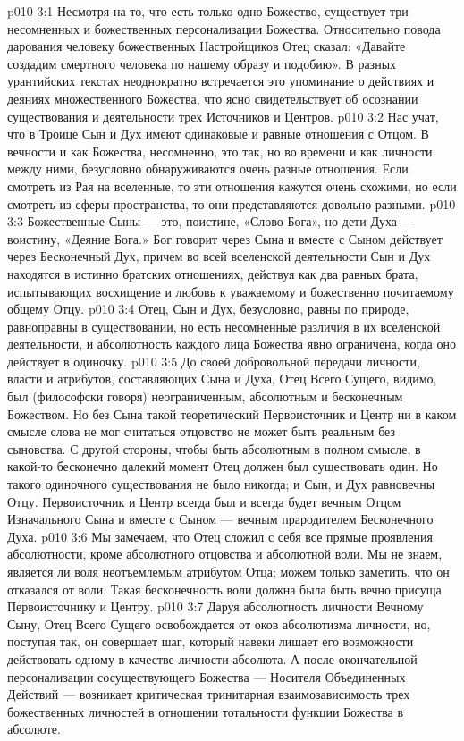 \vs p010 3:1 Несмотря на то, что есть только одно Божество, существует три несомненных и божественных персонализации Божества. Относительно повода дарования человеку божественных Настройщиков Отец сказал: «Давайте создадим смертного человека по нашему образу и подобию». В разных урантийских текстах неоднократно встречается это упоминание о действиях и деяниях множественного Божества, что ясно свидетельствует об осознании существования и деятельности трех Источников и Центров.
\vs p010 3:2 \pc Нас учат, что в Троице Сын и Дух имеют одинаковые и равные отношения с Отцом. В вечности и как Божества, несомненно, это так, но во времени и как личности между ними, безусловно обнаруживаются очень разные отношения. Если смотреть из Рая на вселенные, то эти отношения кажутся очень схожими, но если смотреть из сферы пространства, то они представляются довольно разными.
\vs p010 3:3 Божественные Сыны --- это, поистине, «Слово Бога», но дети Духа --- воистину, «Деяние Бога.» Бог говорит через Сына и вместе с Сыном действует через Бесконечный Дух, причем во всей вселенской деятельности Сын и Дух находятся в истинно братских отношениях, действуя как два равных брата, испытывающих восхищение и любовь к уважаемому и божественно почитаемому общему Отцу.
\vs p010 3:4 Отец, Сын и Дух, безусловно, равны по природе, равноправны в существовании, но есть несомненные различия в их вселенской деятельности, и абсолютность каждого лица Божества явно ограничена, когда оно действует в одиночку.
\vs p010 3:5 \pc До своей добровольной передачи личности, власти и атрибутов, составляющих Сына и Духа, Отец Всего Сущего, видимо, был (философски говоря) неограниченным, абсолютным и бесконечным Божеством. Но без Сына такой теоретический Первоисточник и Центр ни в каком смысле слова не мог считаться  отцовство не может быть реальным без сыновства. С другой стороны, чтобы быть абсолютным в полном смысле, в какой\hyp{}то бесконечно далекий момент Отец должен был существовать один. Но такого одиночного существования не было никогда; и Сын, и Дух равновечны Отцу. Первоисточник и Центр всегда был и всегда будет вечным Отцом Изначального Сына и вместе с Сыном --- вечным прародителем Бесконечного Духа.
\vs p010 3:6 Мы замечаем, что Отец сложил с себя все прямые проявления абсолютности, кроме абсолютного отцовства и абсолютной воли. Мы не знаем, является ли воля неотъемлемым атрибутом Отца; можем только заметить, что он  отказался от воли. Такая бесконечность воли должна была быть вечно присуща Первоисточнику и Центру.
\vs p010 3:7 Даруя абсолютность личности Вечному Сыну, Отец Всего Сущего освобождается от оков абсолютизма личности, но, поступая так, он совершает шаг, который навеки лишает его возможности действовать одному в качестве личности\hyp{}абсолюта. А после окончательной персонализации сосуществующего Божества --- Носителя Объединенных Действий --- возникает критическая тринитарная взаимозависимость трех божественных личностей в отношении тотальности функции Божества в абсолюте.
